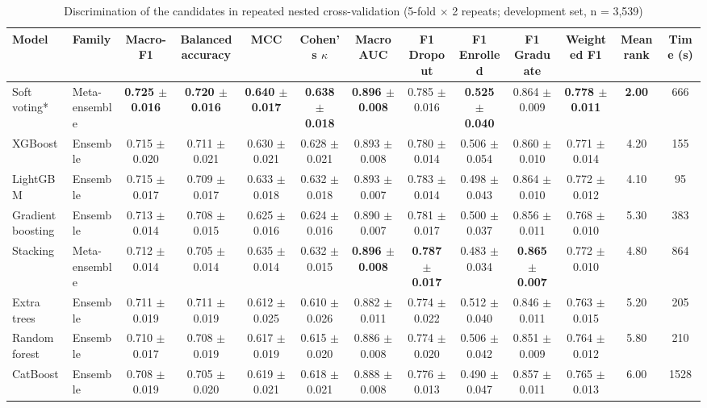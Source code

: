\begin{table}
\caption{Discrimination of the candidates in repeated nested cross-validation (5-fold $\times$ 2 repeats; development set, n = 3,539)}\label{tab:Table2_nested_cv_discrimination}
\footnotesize
\begin{tabular*}{\textwidth}{@{\extracolsep\fill}@{}llccccccccccc@{}}
\toprule
Model & Family & Macro-F1 & Balanced accuracy & MCC & Cohen's $\kappa$ & Macro AUC & F1 Dropout & F1 Enrolled & F1 Graduate & Weighted F1 & Mean rank & Time (s) \\
\midrule
Soft voting* & Meta-ensemble & \textbf{0.725 $\pm$ 0.016} & \textbf{0.720 $\pm$ 0.016} & \textbf{0.640 $\pm$ 0.017} & \textbf{0.638 $\pm$ 0.018} & \textbf{0.896 $\pm$ 0.008} & 0.785 $\pm$ 0.016 & \textbf{0.525 $\pm$ 0.040} & 0.864 $\pm$ 0.009 & \textbf{0.778 $\pm$ 0.011} & \textbf{2.00} & 666 \\
XGBoost & Ensemble & 0.715 $\pm$ 0.020 & 0.711 $\pm$ 0.021 & 0.630 $\pm$ 0.021 & 0.628 $\pm$ 0.021 & 0.893 $\pm$ 0.008 & 0.780 $\pm$ 0.014 & 0.506 $\pm$ 0.054 & 0.860 $\pm$ 0.010 & 0.771 $\pm$ 0.014 & 4.20 & 155 \\
LightGBM & Ensemble & 0.715 $\pm$ 0.017 & 0.709 $\pm$ 0.017 & 0.633 $\pm$ 0.018 & 0.632 $\pm$ 0.018 & 0.893 $\pm$ 0.007 & 0.783 $\pm$ 0.014 & 0.498 $\pm$ 0.043 & 0.864 $\pm$ 0.010 & 0.772 $\pm$ 0.012 & 4.10 & 95 \\
Gradient boosting & Ensemble & 0.713 $\pm$ 0.014 & 0.708 $\pm$ 0.015 & 0.625 $\pm$ 0.016 & 0.624 $\pm$ 0.016 & 0.890 $\pm$ 0.007 & 0.781 $\pm$ 0.017 & 0.500 $\pm$ 0.037 & 0.856 $\pm$ 0.011 & 0.768 $\pm$ 0.010 & 5.30 & 383 \\
Stacking & Meta-ensemble & 0.712 $\pm$ 0.014 & 0.705 $\pm$ 0.014 & 0.635 $\pm$ 0.014 & 0.632 $\pm$ 0.015 & \textbf{0.896 $\pm$ 0.008} & \textbf{0.787 $\pm$ 0.017} & 0.483 $\pm$ 0.034 & \textbf{0.865 $\pm$ 0.007} & 0.772 $\pm$ 0.010 & 4.80 & 864 \\
Extra trees & Ensemble & 0.711 $\pm$ 0.019 & 0.711 $\pm$ 0.019 & 0.612 $\pm$ 0.025 & 0.610 $\pm$ 0.026 & 0.882 $\pm$ 0.011 & 0.774 $\pm$ 0.022 & 0.512 $\pm$ 0.040 & 0.846 $\pm$ 0.011 & 0.763 $\pm$ 0.015 & 5.20 & 205 \\
Random forest & Ensemble & 0.710 $\pm$ 0.017 & 0.708 $\pm$ 0.019 & 0.617 $\pm$ 0.019 & 0.615 $\pm$ 0.020 & 0.886 $\pm$ 0.008 & 0.774 $\pm$ 0.020 & 0.506 $\pm$ 0.042 & 0.851 $\pm$ 0.009 & 0.764 $\pm$ 0.012 & 5.80 & 210 \\
CatBoost & Ensemble & 0.708 $\pm$ 0.019 & 0.705 $\pm$ 0.020 & 0.619 $\pm$ 0.021 & 0.618 $\pm$ 0.021 & 0.888 $\pm$ 0.008 & 0.776 $\pm$ 0.013 & 0.490 $\pm$ 0.047 & 0.857 $\pm$ 0.011 & 0.765 $\pm$ 0.013 & 6.00 & 1528 \\

\end{tabular*}
\end{table}
